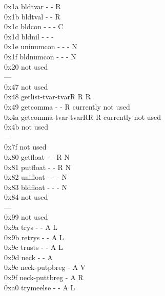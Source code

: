 \documentclass[11pt]{article}
\begin{document}
\begin{tabbing}
0x1a  \> bldtvar	\> - \> - \> R \>   \>	 \>		\\
0x1b  \> bldtval	\> - \> - \> R \>   \>	 \>		\\
0x1c  \> bldcon		\> - \> - \> - \> C \>   \>		\\
0x1d  \> bldnil		\> - \> - \> - \>   \>   \>		\\
0x1e  \> uninumcon	\> - \> - \> - \> N \>   \>		\\
0x1f  \> bldnumcon	\> - \> - \> - \> N \>   \>		\\
0x20  \>		\>   \>   \>   \>   \>	 \> not used	\\
---   \>		\>   \>   \>   \>   \>   \>		\\
0x47  \>		\>   \>   \>   \>   \>   \> not used	\\
0x48  \> getlist-tvar-tvar\>R\> R \> R \>   \>	 \>		\\
0x49  \> getcomma	\> - \> - \> R \>   \>   \> currently not used	\\
0x4a  \> getcomma-tvar-tvar\>R\>R \> R \>   \>   \> currently not used	\\
0x4b  \>		\>   \>   \>   \>   \>	 \> not used	\\
---   \>		\>   \>   \>   \>   \>   \>		\\
0x7f  \>		\>   \>   \>   \>   \>   \> not used	\\
0x80  \> getfloat	\> - \> - \> R \> N \>   \>		\\
0x81  \> putfloat	\> - \> - \> R \> N \>   \>		\\
0x82  \> unifloat	\> - \> - \> - \> N \>   \>		\\
0x83  \> bldfloat	\> - \> - \> - \> N \>   \>		\\
0x84  \>		\>   \>   \>   \>   \>	 \> not used	\\
---   \>		\>   \>   \>   \>   \>   \>		\\
0x99  \>		\>   \>   \>   \>   \>   \> not used	\\
0x9a  \> trys		\> - \> - \> A \> L \>   \>		\\
0x9b  \> retrys		\> - \> - \> A \> L \>   \>		\\
0x9c  \> trusts		\> - \> - \> A \> L \>   \>		\\
0x9d  \> neck		\> - \> - \> A \>   \>   \>		\\
0x9e  \> neck-putpbreg	\> - \> A \> V \>   \>	 \>		\\
0x9f  \> neck-puttbreg	\> - \> A \> R \>   \>	 \>		\\
0xa0  \> trymeelse	\> - \> - \> A \> L \>   \>		\\

\end{tabbing}
\end{document}
